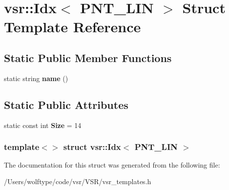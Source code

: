 \hypertarget{structvsr_1_1_idx_3_01_p_n_t___l_i_n_01_4}{\section{vsr\-:\-:Idx$<$ P\-N\-T\-\_\-\-L\-I\-N $>$ Struct Template Reference}
\label{structvsr_1_1_idx_3_01_p_n_t___l_i_n_01_4}
}
\subsection*{Static Public Member Functions}
\begin{DoxyCompactItemize}
\item 
\hypertarget{structvsr_1_1_idx_3_01_p_n_t___l_i_n_01_4_ad26201656a1afbea99a95938c94f74a1}{static string {\bfseries name} ()}\label{structvsr_1_1_idx_3_01_p_n_t___l_i_n_01_4_ad26201656a1afbea99a95938c94f74a1}

\end{DoxyCompactItemize}
\subsection*{Static Public Attributes}
\begin{DoxyCompactItemize}
\item 
\hypertarget{structvsr_1_1_idx_3_01_p_n_t___l_i_n_01_4_a5ca1f32be9da593718c43453b6a020fc}{static const int {\bfseries Size} = 14}\label{structvsr_1_1_idx_3_01_p_n_t___l_i_n_01_4_a5ca1f32be9da593718c43453b6a020fc}

\end{DoxyCompactItemize}
\subsubsection*{template$<$$>$ struct vsr\-::\-Idx$<$ P\-N\-T\-\_\-\-L\-I\-N $>$}



The documentation for this struct was generated from the following file\-:\begin{DoxyCompactItemize}
\item 
/\-Users/wolftype/code/vsr/\-V\-S\-R/vsr\-\_\-templates.\-h\end{DoxyCompactItemize}
